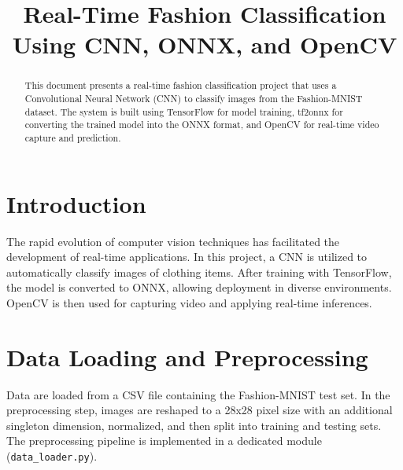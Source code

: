 \documentclass[conference]{IEEEtran}
\begin{document}
\title{Real-Time Fashion Classification Using CNN, ONNX, and OpenCV}

\author{
}

\maketitle

\begin{abstract}
This document presents a real-time fashion classification project that uses a Convolutional Neural Network (CNN) to classify images from the Fashion-MNIST dataset. The system is built using TensorFlow for model training, tf2onnx for converting the trained model into the ONNX format, and OpenCV for real-time video capture and prediction.
\end{abstract}

\section{Introduction}
The rapid evolution of computer vision techniques has facilitated the development of real-time applications. In this project, a CNN is utilized to automatically classify images of clothing items. After training with TensorFlow, the model is converted to ONNX, allowing deployment in diverse environments. OpenCV is then used for capturing video and applying real-time inferences.

\section{Data Loading and Preprocessing}
Data are loaded from a CSV file containing the Fashion-MNIST test set. In the preprocessing step, images are reshaped to a 28x28 pixel size with an additional singleton dimension, normalized, and then split into training and testing sets. The preprocessing pipeline is implemented in a dedicated module (\texttt{data\_loader.py}).
\end{document}
